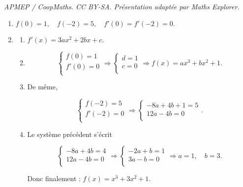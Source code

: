 \documentclass[10pt]{article}
\begin{document}
\noindent\textit{APMEP / CoopMaths. CC BY-SA. Présentation adaptée par Maths Explorer.}\par\medskip
\begin{enumerate}
	\item $f(0) = 1, \quad f(-2) = 5, \quad f'(0) = f'(-2) = 0.$
	
	\item \begin{enumerate}
	\item	$f'(x) = 3ax^2 + 2bx + c.$
	\item 
	
	\[
	\begin{cases}
		f(0) = 1 \\
		f'(0) = 0 \\
	\end{cases}
	\Rightarrow
	\begin{cases}
		d = 1 \\
		c = 0 \\
	\end{cases}
	\Rightarrow f(x) = ax^3 + bx^2 + 1.
	\]
	
	\item De même,
	
	\[
	\begin{cases}
		f(-2) = 5 \\
		f'(-2) = 0 \\
	\end{cases}
	\Rightarrow
	\begin{cases}
		-8a + 4b + 1 = 5 \\
		12a - 4b = 0 \\
	\end{cases}.
	\]
	
		\item Le système précédent s'écrit
	
	\[
	\begin{cases}
		-8a + 4b = 4 \\
		12a - 4b = 0 \\
	\end{cases}
	\Rightarrow
	\begin{cases}
		-2a + b = 1 \\
		3a - b = 0 \\
	\end{cases}
	\Rightarrow a = 1, \quad b = 3.
	\]
	
	Donc finalement : \(f(x) = x^3 + 3x^2 + 1\).
\end{enumerate}
\end{enumerate}
\end{document}
